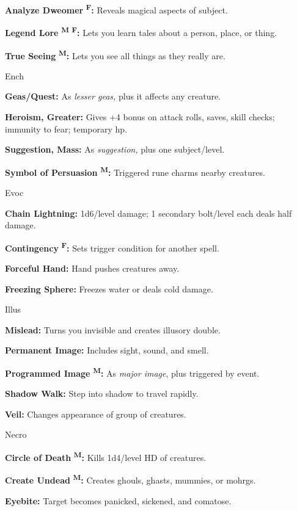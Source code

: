 \documentclass{article}
\begin{document}
\textbf{Analyze Dweomer }\textsuperscript{\textbf{F}}\textbf{:} Reveals magical 
aspects of subject.

\textbf{Legend Lore }\textsuperscript{\textbf{M}}{\scriptsize{}\textbf{ }}\textsuperscript{\textbf{F}}\textbf{:} 
Lets you learn tales about a person, place, or thing.

\textbf{True Seeing }\textsuperscript{\textbf{M}}\textbf{:} Lets you see all things 
as they really are.

Ench

\textbf{Geas/Quest:} As \textit{lesser geas, }plus it affects any creature.

\textbf{Heroism, Greater:} Gives +4 bonus on attack rolls, saves, skill checks; 
immunity to fear; temporary hp.

\textbf{Suggestion, Mass:} As \textit{suggestion, }plus one subject/level.

\textbf{Symbol of Persuasion }\textsuperscript{\textbf{M}}\textbf{:} Triggered 
rune charms nearby creatures.

Evoc

\textbf{Chain Lightning:} 1d6/level damage; 1 secondary bolt/level each deals half 
damage.

\textbf{Contingency }\textsuperscript{\textbf{F}}\textbf{:} Sets trigger condition 
for another spell.

\textbf{Forceful Hand:} Hand pushes creatures away.

\textbf{Freezing Sphere:} Freezes water or deals cold damage.

Illus

\textbf{Mislead:} Turns you invisible and creates illusory double.

\textbf{Permanent Image:} Includes sight, sound, and smell.

\textbf{Programmed Image }\textsuperscript{\textbf{M}}\textbf{:} As \textit{major 
image}, plus triggered by event.

\textbf{Shadow Walk:} Step into shadow to travel rapidly.

\textbf{Veil:} Changes appearance of group of creatures.

Necro

\textbf{Circle of Death }\textsuperscript{\textbf{M}}\textbf{:} Kills 1d4/level 
HD of creatures.

\textbf{Create Undead }\textsuperscript{\textbf{M}}\textbf{:} Creates ghouls, ghasts, 
mummies, or mohrgs.

\textbf{Eyebite:} Target becomes panicked, sickened, and comatose.
\end{document}
